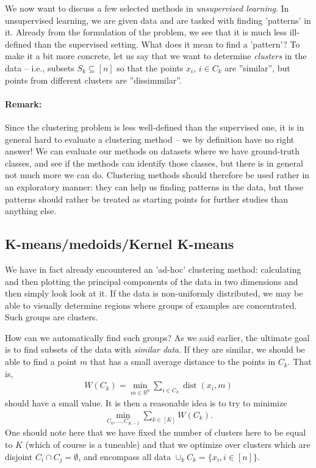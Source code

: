 \documentclass{article}
\newcommand{\R}{\mathbb{R}}
\newcommand{\sse}{\subseteq}
\DeclareMathOperator{\dist}{dist}
\begin{document}
We now want to discuss a few selected methods in \emph{unsupervised learning}. In unsupervised learning, we are given data and are tasked with finding 'patterns' in it. Already from the formulation of the problem, we see that it is much less ill-defined than the supervised setting. What does it mean to find a 'pattern'? To make it a bit more concrete, let us say that we want to determine \emph{clusters} in the data -- i.e., subsets $S_k\sse [n]$ so that the points $x_i$, $i\in C_k$ are ''similar'', but points from different clusters are ''dissimmilar''.

\paragraph{Remark:} Since the clustering problem is less well-defined than the supervised one, it is in general hard to evaluate a clustering method -- we by definition have no right answer! We can evaluate our methods on datasets where we have ground-truth classes, and see if the methods can identify those classes, but there is in general not much more we can do. Clustering methods should therefore be used rather in an exploratory manner: they can help us finding patterns in the data, but these patterns should rather be treated as starting points for further studies than anything else. \newline

\subsection{K-means/medoids/Kernel K-means}
We have in fact already encountered an 'ad-hoc' clustering method: calculating and then plotting the principal components of the data in two dimensions and then simply look look at it. If the data is non-uniformly distributed, we may be able to visually determine regions where groups of examples are concentrated. Such groups are clusters. 

How can we automatically find such groups? As we said earlier, the ultimate goal is to find subsets of the data with \emph{similar data}. If they are similar, we should be able to find a point $m$ that has a small average distance to the points in $C_k$. That is,
\begin{align}
    W(C_k) = \min_{m\in \R^p} \sum_{i \in C_k} \dist(x_i,m) \label{eq:means}
\end{align}
should have a small value. It is then a reasonable idea is to try to minimize
\begin{align} \label{eq:cluster}
    \min_{C_0, \dots, C_{K-1}} \sum_{k \in [K]} W(C_k).
\end{align}
One should note here that we have fixed the number of clusters here to be equal to $K$ (which of course is a tuneable) and that we optimize over clusters which are disjoint $C_i \cap C_j=\emptyset$, and encompass all data $\cup_{k} C_k = \{x_i, i \in [n]\}$.
\end{document}
